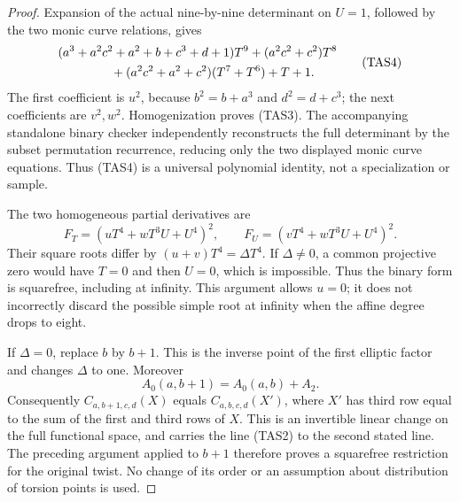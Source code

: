 \begin{proof}
Expansion of the actual nine-by-nine determinant on \(U=1\),
followed by the two monic curve relations, gives
\[
 \begin{split}
 &(a^3+a^2c^2+a^2+b+c^3+d+1)T^9
       +(a^2c^2+c^2)T^8\\
 &\hspace{15mm}+(a^2c^2+a^2+c^2)(T^7+T^6)+T+1.
 \end{split}
 \tag{TAS4}
\]
The first coefficient is \(u^2\), because
\(b^2=b+a^3\) and \(d^2=d+c^3\); the next coefficients
are \(v^2,w^2\). Homogenization proves (TAS3).
The accompanying standalone binary checker independently reconstructs
the full determinant by the subset permutation recurrence, reducing
only the two displayed monic curve equations. Thus (TAS4) is a
universal polynomial identity, not a specialization or sample.

The two homogeneous partial derivatives are
\[
 F_T=(uT^4+wT^3U+U^4)^2,\qquad
 F_U=(vT^4+wT^3U+U^4)^2.
 \tag{TAS5}
\]
Their square roots differ by
\((u+v)T^4=\Delta T^4\). If \(\Delta\ne0\), a common
projective zero would have \(T=0\) and then \(U=0\), which
is impossible. Thus the binary form is squarefree, including at
infinity. This argument allows \(u=0\); it does not incorrectly
discard the possible simple root at infinity when the affine
degree drops to eight.

If \(\Delta=0\), replace \(b\) by \(b+1\). This is the
inverse point of the first elliptic factor and changes \(\Delta\)
to one. Moreover
\[
                    A_0(a,b+1)=A_0(a,b)+A_2.
 \tag{TAS6}
\]
Consequently \(C_{a,b+1,c,d}(X)\) equals
\(C_{a,b,c,d}(X')\), where \(X'\) has third row equal
to the sum of the first and third rows of \(X\).
This is an invertible linear change on the full functional space,
and carries the line (TAS2) to the second stated line. The preceding
argument applied to \(b+1\) therefore proves a squarefree
restriction for the original twist. No change of its order or
an assumption about distribution of torsion points is used.
\end{proof}

